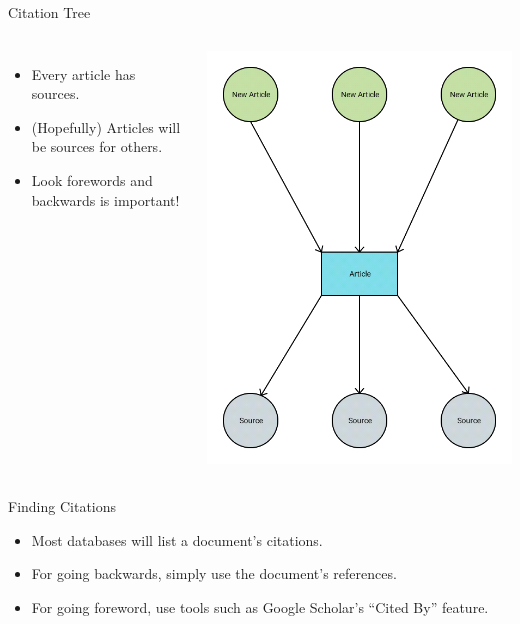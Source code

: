 \documentclass[handout]{beamer}
\begin{document}
\begin{frame}{Citation Tree}
    \begin{columns}
    \begin{itemize}
        \item Every article has sources.
        \item (Hopefully) Articles will be sources for others.
        \item Look forewords and backwards is important!
    \end{itemize}
    \includegraphics[width=\textwidth]{images/citations}
    \end{columns}
\end{frame}

\begin{frame}{Finding Citations}
    \begin{itemize}
        \item Most databases will list a document's citations.
        \item For going backwards, simply use the document's references.
        \item For going foreword, use tools such as Google Scholar's ``Cited By'' feature.
    \end{itemize}
\end{frame}
\end{document}
